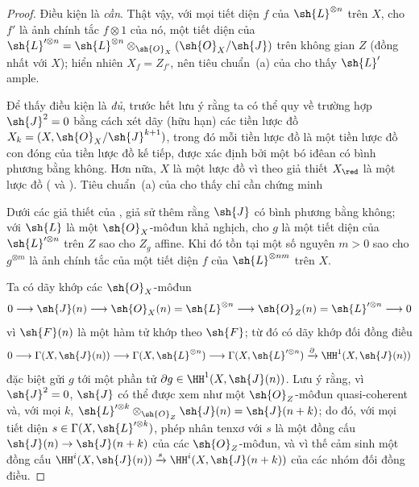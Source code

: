 \documentclass[oneside,10pt]{amsart}
\makeatletter
\newcommand{\ega@arrow}[2]{\mathchoice{#1}{#2}{#2}{#2}}
\renewcommand{\to}{\ega@arrow{\longrightarrow}{\rightarrow}}
\newcommand{\oldpage}[2][]{\marginnote{\normalfont\footnotesize\textbf{#1}~|~#2}\ignorespaces}
\let\EGAOriginalLabel\label
\renewcommand{\label}[1]{\phantomsection\EGAOriginalLabel{#1}}
\makeatother
\begin{document}
\begin{proof}
Điều kiện là \emph{cần}.
Thật vậy, với mọi tiết diện $f$ của $\sh{L}^{\otimes n}$ trên $X$, cho $f'$ là ảnh chính tắc $f\otimes1$ của nó, một tiết diện của $\sh{L}'^{\otimes n}=\sh{L}^{\otimes n}\otimes_{\sh{O}_X}(\sh{O}_X/\sh{J})$ trên không gian $Z$ (đồng nhất với $X$);
hiển nhiên $X_f=Z_{f'}$, nên tiêu chuẩn~(a) của  cho thấy $\sh{L}'$ ample.

Để thấy điều kiện là \emph{đủ}, trước hết lưu ý rằng ta có thể quy về trường hợp $\sh{J}^2=0$ bằng cách xét dãy (hữu hạn) các tiền lược đồ $X_k=(X,\sh{O}_X/\sh{J}^{k+1})$, trong đó mỗi tiền lược đồ là một tiền lược đồ con đóng của tiền lược đồ kế tiếp, được xác định bởi một bó iđêan có bình phương bằng không.
Hơn nữa, $X$ là một lược đồ vì theo giả thiết $X_\red$ là một lược đồ ( và ).
Tiêu chuẩn~(a) của  cho thấy chỉ cần chứng minh
  \begin{lemma}[4.5.13.1]
  \label{II.4.5.13.1}
  Dưới các giả thiết của , giả sử thêm rằng $\sh{J}$ có bình phương bằng không;
  với $\sh{L}$ là một $\sh{O}_X$-môđun khả nghịch, cho $g$ là một tiết diện của $\sh{L}'^{\otimes n}$ trên $Z$ sao cho $Z_g$ affine.
  Khi đó tồn tại một số nguyên $m>0$ sao cho $g^{\otimes m}$ là ảnh chính tắc của một tiết diện $f$ của $\sh{L}^{\otimes nm}$ trên $X$.
  \end{lemma}

  Ta có dãy khớp các $\sh{O}_X$-môđun
  \[
    0\to\sh{J}(n)\to\sh{O}_X(n)=\sh{L}^{\otimes n}\to\sh{O}_Z(n)=\sh{L}'^{\otimes n}\to0
  \]
\oldpage[II]{88}
  vì $\sh{F}(n)$ là một hàm tử khớp theo $\sh{F}$;
  từ đó có dãy khớp đối đồng điều
  \[
    0\to\Gamma(X,\sh{J}(n))\to\Gamma(X,\sh{L}^{\otimes n})\to\Gamma(X,\sh{L}'^{\otimes n})\xrightarrow{\partial}\HH^1(X,\sh{J}(n))
  \]
  đặc biệt gửi $g$ tới một phần tử $\partial g\in\HH^1(X,\sh{J}(n))$.
  Lưu ý rằng, vì $\sh{J}^2=0$, $\sh{J}$ có thể được xem như một $\sh{O}_Z$-môđun quasi-coherent và, với mọi $k$, $\sh{L}'^{\otimes k}\otimes_{\sh{O}_Z}\sh{J}(n)=\sh{J}(n+k)$;
  do đó, với mọi tiết diện $s\in\Gamma(X,\sh{L}'^{\otimes k})$, phép nhân tenxơ với $s$ là một đồng cấu $\sh{J}(n)\to\sh{J}(n+k)$ của các $\sh{O}_Z$-môđun, và vì thế cảm sinh một đồng cấu $\HH^i(X,\sh{J}(n))\xrightarrow{s}\HH^i(X,\sh{J}(n+k))$ của các nhóm đối đồng điều.


\end{proof}
\end{document}

